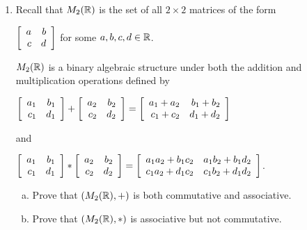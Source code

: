 \documentclass[11pt,fleqn,dvipsnames,usenames]{article}
\begin{document}
\begin{enumerate}[1.]
\item \label{m2rbas}Recall that $M_{2}(\R)$ is the set of all $2\times 2$ matrices of the form
\begin{center}
$\MATRIX{rr}{a & b\\c& d}$ for some $a,b,c,d\in\R$.
\end{center}
$M_{2}(\R)$ is a binary algebraic structure under both the addition and multiplication operations defined by
\begin{center}
$\MATRIX{rr}{a_{1} & b_{1}\\c_{1} & d_{1}} + \MATRIX{rr}{a_{2} & b_{2}\\c_{2} & d_{2}} = \MATRIX{rr}{a_{1} + a_{2} & b_{1} + b_{2}\\c_{1} + c_{2} & d_{1} + d_{2}}$ 
\end{center}
and 
\begin{center}
$\MATRIX{rr}{a_{1} & b_{1}\\c_{1} & d_{1}} * \MATRIX{rr}{a_{2} & b_{2}\\c_{2} & d_{2}} = \MATRIX{rr}{a_{1}a_{2} + b_{1}c_{2} & a_{1}b_{2} + b_{1}d_{2}\\c_{1}a_{2} + d_{1}c_{2} & c_{1}b_{2} + d_{1}d_{2}}$.
\end{center}
\begin{enumerate}[(a)]
\item Prove that $(M_{2}(\R), +)$ is both commutative and associative.
\item Prove that $(M_{2}(\R), *)$ is associative but not commutative.
\end{enumerate}
\end{enumerate}
\vsp
\end{document}
